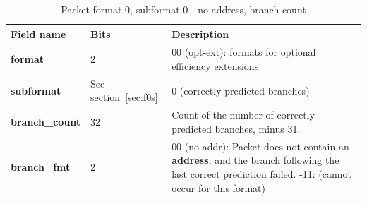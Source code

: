 \begin{table}[htp]
  \centering
  \caption{Packet format 0, subformat 0 - no address, branch count}
  \label{tab:te_inst0-0-noaddr-count}
  \begin{tabulary}{\textwidth}{|l|p{35mm}|p{90mm}|}
    \hline
    {\bf Field name} & {\bf Bits} & {\bf Description} \\
    \hline
    \textbf{format}	& 2	& 00 (opt-ext): formats for optional efficiency extensions\\
    \hline
    \textbf{subformat}  & See section~\ref{sec:f0s} & 0 (correctly predicted branches)\\
    \hline
    \textbf{branch\_count} & 32 & Count of the number of correctly predicted branches, minus 31. \\
    \hline
    \textbf{branch\_fmt} & 2 & 00 (no-addr): Packet does not contain an \textbf{address}, and the branch following the 
    last correct prediction failed. -11: (cannot occur for this format) \\
    \hline
  \end{tabulary}
\end{table}


